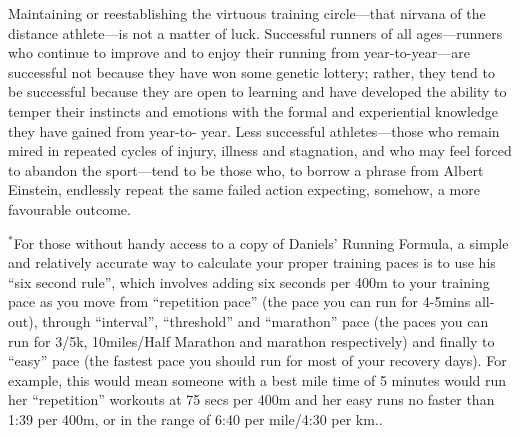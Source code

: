 Maintaining or reestablishing the virtuous training circle—that nirvana of the distance athlete—is not a matter of luck. Successful runners of all ages—runners who continue to improve and to enjoy their running from year-to-year—are successful not because they have won some genetic lottery; rather, they tend to be successful because they are open to learning and have developed the ability to temper their instincts and emotions with the formal and experiential knowledge they have gained from year-to- year. Less successful athletes—those who remain mired in repeated cycles of injury, illness and stagnation, and who may feel forced to abandon the sport—tend to be those who, to borrow a phrase from Albert Einstein, endlessly repeat the same failed action expecting, somehow, a more favourable outcome.

$^*$For those without handy access to a copy of Daniels’ Running Formula, a simple and relatively accurate way to calculate your proper training paces is to use his “six second rule”, which involves adding six seconds per 400m to your training pace as you move from “repetition pace” (the pace you can run for 4-5mins all-out), through “interval”, “threshold” and “marathon” pace (the paces you can run for 3/5k, 10miles/Half Marathon and marathon respectively) and finally to “easy” pace (the fastest pace you should run for most of your recovery days). For example, this would mean someone with a best mile time of 5 minutes would run her “repetition” workouts at 75 secs per 400m and her easy runs no faster than 1:39 per 400m, or in the range of 6:40 per mile/4:30 per km..





